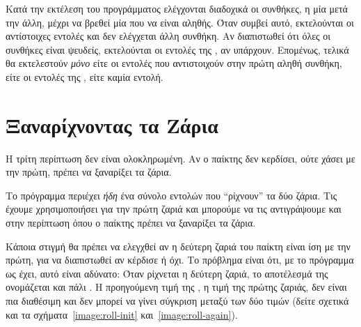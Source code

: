 \documentclass[a4paper,11pt,oneside]{book}
\begin{document}
Κατά την εκτέλεση του προγράμματος ελέγχονται διαδοχικά οι συνθήκες, η μία μετά την άλλη, μέχρι να βρεθεί μία που να είναι αληθής. Όταν συμβεί αυτό, εκτελούνται οι αντίστοιχες εντολές και δεν ελέγχεται άλλη συνθήκη. Αν διαπιστωθεί ότι όλες οι συνθήκες είναι ψευδείς, εκτελούνται οι εντολές της , αν υπάρχουν. Επομένως, τελικά θα εκτελεστούν \emph{μόνο} είτε οι εντολές που αντιστοιχούν στην πρώτη αληθή συνθήκη, είτε οι εντολές της , είτε καμία εντολή.

\section{Ξαναρίχνοντας τα Ζάρια}

\begin{question}
Η τρίτη περίπτωση δεν είναι ολοκληρωμένη. Αν ο παίκτης δεν κερδίσει, ούτε χάσει με την πρώτη, πρέπει να ξαναρίξει τα ζάρια.
\end{question}

Το πρόγραμμα περιέχει \emph{ήδη} ένα σύνολο εντολών που ``ρίχνουν'' τα δύο ζάρια. Τις έχουμε χρησιμοποιήσει για την πρώτη ζαριά και μπορούμε να τις αντιγράψουμε και στην περίπτωση όπου ο παίκτης πρέπει να ξαναρίξει τα ζάρια. 


Κάποια στιγμή θα πρέπει να ελεγχθεί αν η δεύτερη ζαριά του παίκτη είναι ίση με την πρώτη, για να διαπιστωθεί αν κέρδισε ή όχι. Το πρόβλημα είναι ότι, με το πρόγραμμα ως έχει, αυτό είναι αδύνατο: Όταν ρίχνεται η δεύτερη ζαριά, το αποτέλεσμά της ονομάζεται και πάλι . Η προηγούμενη τιμή της , η τιμή της πρώτης ζαριάς, δεν είναι πια διαθέσιμη και δεν μπορεί να γίνει σύγκριση μεταξύ των δύο τιμών (δείτε σχετικά και τα σχήματα~\ref{image:roll-init} και~\ref{image:roll-again}).
\end{document}
